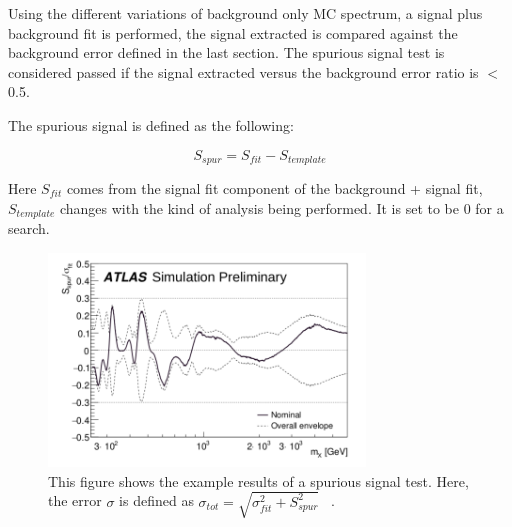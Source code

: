 Using the different variations of background only MC spectrum, a signal plus background fit is performed, the signal extracted is compared against the background error defined in the last section. The spurious signal test is considered passed if the signal extracted versus the background error ratio is $<$ 0.5.

    The spurious signal is defined as the following:
    
    \begin{equation}
        S_{spur} = S_{fit} - S_{template}
    \end{equation}

    Here $S_{fit}$ comes from the signal fit component of the background + signal fit, $S_{template}$ changes with the kind of analysis being performed. It is set to be 0 for a search.     

\begin{figure}[!htb]
    \begin{center}
        \includegraphics[width=0.75\textwidth]{figures/chapter_analysismethod/Spurious}
        \caption{
            This figure shows the example results of a spurious signal test. Here, the error $\sigma$ is defined as $\sigma_{tot} = \sqrt{\sigma^{2}_{fit}+ S_{spur}^{2}}$ ~\cite{ATL-PHYS-PUB-2020-028}.
        }
        \label{spurioussignal}
    \end{center}
\end{figure}
\FloatBarrier

